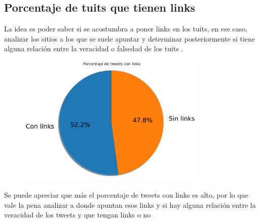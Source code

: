 \documentclass[titlepage,a4paper]{article}
\begin{document}
\subsection{\Large Porcentaje de tuits que tienen links}
{\Large 
La idea es poder saber si se acostumbra a poner links en los tuits, en ese caso, analizar los sitios a los que se suele apuntar y determinar posteriormente si tiene alguna relación entre la veracidad o falsedad de los tuits .\\
\par}
{\Large
\begin{figure}[H]
 \centering
 \includegraphics[width=0.8\textwidth, height=0.8\textheight, keepaspectratio]{graficos/porcentajetuitsconlinks.png}
\end{figure}
Se puede apreciar que más el porcentaje de tweets con links es alto, por lo que vale la pena analizar a donde apuntan esos links y si hay alguna relación entre la veracidad de los tweets y que tengan links o no
\par}
\end{document}
